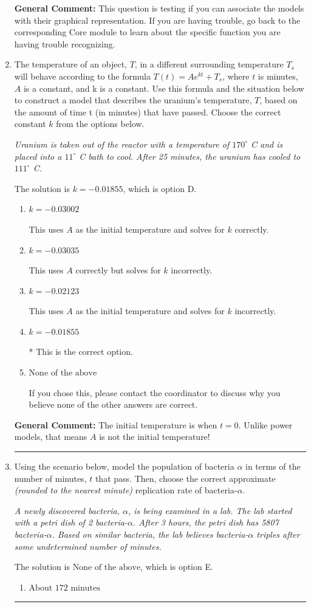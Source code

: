 \documentclass{extbook}[14pt]
\newcommand{\litem}[1]{\item #1

\rule{\textwidth}{0.4pt}}
\begin{document}
\begin{enumerate}
{\textbf{General Comment:} This question is testing if you can associate the models with their graphical representation. If you are having trouble, go back to the corresponding Core module to learn about the specific function you are having trouble recognizing.
}
\litem{
The temperature of an object, $T$, in a different surrounding temperature $T_s$ will behave according to the formula $T(t) = Ae^{kt} + T_s$, where $t$ is minutes, $A$ is a constant, and k is a constant. Use this formula and the situation below to construct a model that describes the uranium's temperature, $T$, based on the amount of time t (in minutes) that have passed. Choose the correct constant $k$ from the options below.

\begin{center}
    \textit{ Uranium is taken out of the reactor with a temperature of $170^{\circ}$ C and is placed into a $11^{\circ}$ C bath to cool. After 25 minutes, the uranium has cooled to $111^{\circ}$ C. }
\end{center}
The solution is \( k = -0.01855 \), which is option D.\begin{enumerate}[label=\Alph*.]
\item \( k = -0.03002 \)

This uses $A$ as the initial temperature and solves for $k$ correctly.
\item \( k = -0.03035 \)

This uses $A$ correctly but solves for $k$ incorrectly.
\item \( k = -0.02123 \)

This uses $A$ as the initial temperature and solves for $k$ incorrectly.
\item \( k = -0.01855 \)

* This is the correct option.
\item \( \text{None of the above} \)

If you chose this, please contact the coordinator to discuss why you believe none of the other answers are correct.
\end{enumerate}

\textbf{General Comment:} The initial temperature is when $t = 0$. Unlike power models, that means $A$ is not the initial temperature!
}
\litem{
Using the scenario below, model the population of bacteria $\alpha$ in terms of the number of minutes, $t$ that pass. Then, choose the correct approximate \textit{(rounded to the nearest minute)} replication rate of bacteria-$\alpha$.

\begin{center}
    \textit{ A newly discovered bacteria, $\alpha$, is being examined in a lab. The lab started with a petri dish of 2 bacteria-$\alpha$. After 3 hours, the petri dish has 5807 bacteria-$\alpha$. Based on similar bacteria, the lab believes bacteria-$\alpha$ triples after some undetermined number of minutes. }
\end{center}
The solution is \( \text{None of the above} \), which is option E.\begin{enumerate}[label=\Alph*.]
\item \( \text{About } 172 \text{ minutes} \)


\end{enumerate}}
\end{enumerate}
\end{document}

